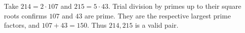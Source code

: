 Take $214=2\cdot107$ and $215=5\cdot43$. Trial division by primes up to their square roots confirms $107$ and $43$ are prime. They are the respective largest prime factors, and $107+43=150$. Thus $\boxed{214,215}$ is a valid pair.
